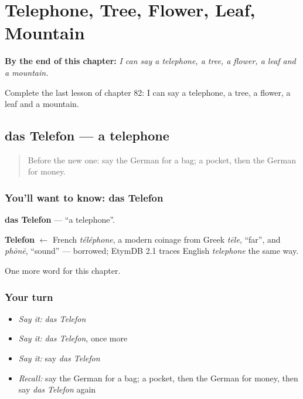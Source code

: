 
\chapter{Telephone, Tree, Flower, Leaf, Mountain}
\label{ch:ge-telephone-tree-flower-leaf-mountain}

\begin{chapteropening}
\textbf{By the end of this chapter:} \emph{I can say a telephone, a tree, a flower, a leaf and a mountain.}

Complete the last lesson of chapter 82: I can say a telephone, a tree, a flower, a leaf and a mountain.
\end{chapteropening}

\section[das Telefon]{das Telefon — a telephone}

\label{lesson:GE-C82-telefon}



\begin{quote}
Before the new one: say the German for a bag; a pocket, then the German for money.
\end{quote}

\subsection*{You'll want to know: das Telefon}
\textbf{das Telefon} — \textquotedblleft{}a telephone\textquotedblright{}.

\begin{cousinweb}
\textbf{Telefon} $\leftarrow$ French \emph{téléphone}, a modern coinage from Greek \emph{tēle}, \textquotedblleft{}far\textquotedblright{}, and \emph{phōnē}, \textquotedblleft{}sound\textquotedblright{} — borrowed; EtymDB 2.1 traces English \emph{telephone} the same way.
\end{cousinweb}

\begin{grammarlens}[title={What you've built}]
One more word for this chapter.
\end{grammarlens}

\subsection*{Your turn}
\begin{itemize}
\raggedright
  \item \emph{Say it:} \emph{das Telefon}
  \item \emph{Say it:} \emph{das Telefon}, once more
  \item \emph{Say it:} say \emph{das Telefon}
  \item \emph{Recall:} say the German for a bag; a pocket, then the German for money, then say \emph{das Telefon} again
\end{itemize}

